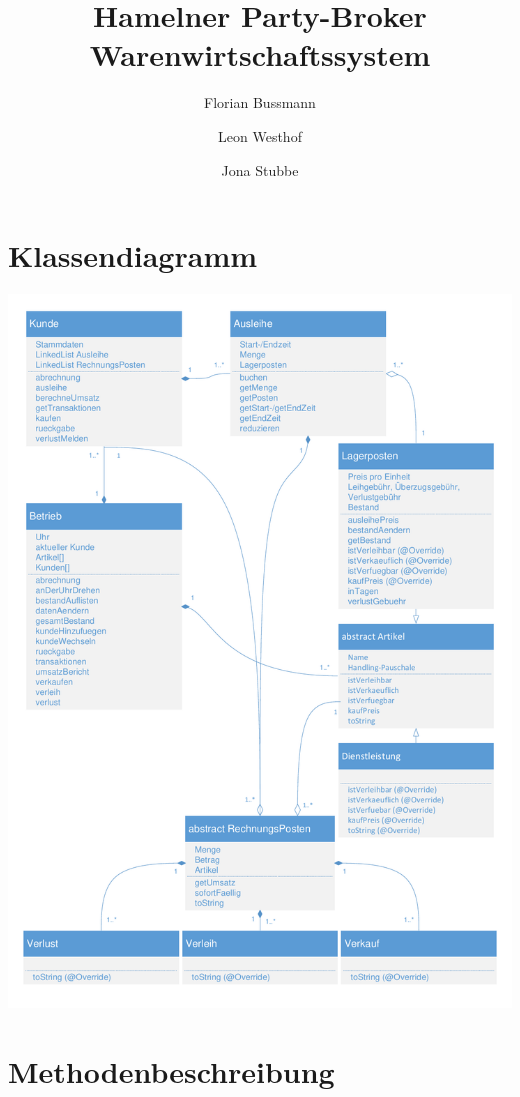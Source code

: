 \documentclass[a4paper,12pt,titlepage]{article}
\title{Hamelner Party-Broker Warenwirtschaftssystem}
\author{Florian Bussmann \and Leon Westhof \and Jona Stubbe}
\begin{document}
\maketitle
\tableofcontents
\part{Klassendiagramm}
\includegraphics[width=\textwidth]{Klassendiagramm.pdf}
\newpage
\part{Methodenbeschreibung}
\end{document}

